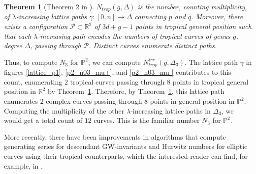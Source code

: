 \documentclass{amsart}
\newtheorem{theorem}{Theorem}[section]
\begin{document}
\begin{theorem}[Theorem 2 in \cite{MikEnumTropGeom}] \label{thm: 7.3} $N_{trop}(g, \Delta)$ is the number, counting multiplicity, of $\lambda$-increasing lattice paths $\gamma: [0,n]\rightarrow \Delta$ connecting $p$ and $q$. Moreover, there exists a configuration $\mathcal{P}\subset \mathbb{R}^2$ of $3d+g-1$ points in tropical general position such that each $\lambda$-increasing path encodes the numbers of tropical curves of genus $g$, degree $\Delta$, passing through $\mathcal{P}$. Distinct curves enumerate distinct paths.

\end{theorem}

Thus, to compute $N_3$ for $\mathbb{P}^2$, we can compute $N^{irr}_{trop}(g, \Delta_3)$. The lattice path $\gamma$ in figures \ref{lattice_p1}, \ref{p2_n03_mu+}, and \ref{p2_n03_mu-} contributes to this count, enumerating $2$ tropical curves passing through $8$ points in tropical general position in $\mathbb{R}^2$ by Theorem~\ref{thm: 7.3}. Therefore, by Theorem~\ref{thm: 7.3}, this lattice path enumerates $2$ complex curves passing through $8$ points in general position in $\mathbb{P}^2$. Computing the multiplicity of the other $\lambda$-increasing lattice paths in $\Delta_3$, we would get a total count of $12$ curves. This is the familiar number $N_3$ for $\mathbb{P}^2$.

More recently, there have been improvements in algorithms that compute generating series for descendant GW-invariants and Hurwitz numbers for elliptic curves using their tropical counterparts, which the interested reader can find, for example, in \cite{aga2023algorithmsgromovwitteninvariantselliptic}.
\end{document}
